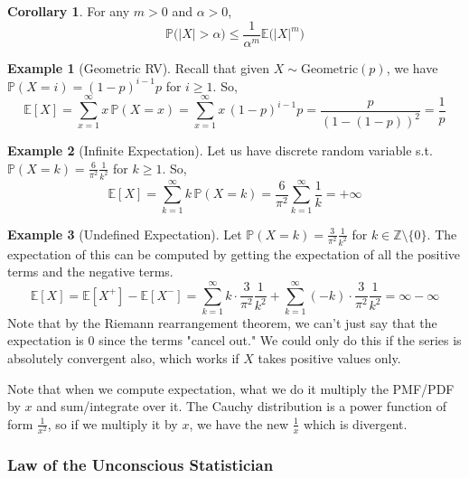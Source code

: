\documentclass{article}
\theoremstyle{definition}
\newtheorem{example}{Example}[section]
\newtheorem{corollary}{Corollary}[theorem]
\theoremstyle{remark}
\theoremstyle{definition}
\begin{document}
\begin{corollary}
For any $m > 0$ and $\alpha > 0$,  
\[\mathbb{P} \big(|X| > \alpha \big) \leq \frac{1}{\alpha^m} \mathbb{E} \big( |X|^m \big)\]
\end{corollary}

\begin{example}[Geometric RV]
Recall that given $X \sim \mathrm{Geometric}(p)$, we have $\mathbb{P}(X = i) = (1 - p)^{i-1} p$ for $i \geq 1$. So, 
\[\mathbb{E}[X] = \sum_{x=1}^\infty x \, \mathbb{P}(X = x) = \sum_{x=1}^\infty x \, (1 - p)^{i-1} p = \frac{p}{(1 - (1 - p))^2} = \frac{1}{p}\]
\end{example}

\begin{example}[Infinite Expectation]
Let us have discrete random variable s.t. $\mathbb{P}(X = k) = \frac{6}{\pi^2} \frac{1}{k^2}$ for $k \geq 1$. So, 
\[\mathbb{E}[X] = \sum_{k=1}^\infty k \, \mathbb{P}(X = k) = \frac{6}{\pi^2} \sum_{k=1}^\infty \frac{1}{k} = +\infty\]
\end{example}

\begin{example}[Undefined Expectation]
Let $\mathbb{P}(X = k) = \frac{3}{\pi^2} \frac{1}{k^2}$ for $k \in \mathbb{Z}\setminus \{0\}$. The expectation of this can be computed by getting the expectation of all the positive terms and the negative terms. 
\[\mathbb{E}[X] = \mathbb{E}[X^+] - \mathbb{E}[X^{-}] = \sum_{k=1}^\infty k \cdot \frac{3}{\pi^2} \frac{1}{k^2} + \sum_{k=1}^\infty (-k) \cdot \frac{3}{\pi^2} \frac{1}{k^2} = \infty - \infty\]
Note that by the Riemann rearrangement theorem, we can't just say that the expectation is $0$ since the terms "cancel out." We could only do this if the series is absolutely convergent also, which works if $X$ takes positive values only. 
\end{example}

Note that when we compute expectation, what we do it multiply the PMF/PDF by $x$ and sum/integrate over it. The Cauchy distribution is a power function of form $\frac{1}{x^2}$, so if we multiply it by $x$, we have the new $\frac{1}{x}$ which is divergent. 

\subsubsection{Law of the Unconscious Statistician}
\end{document}
